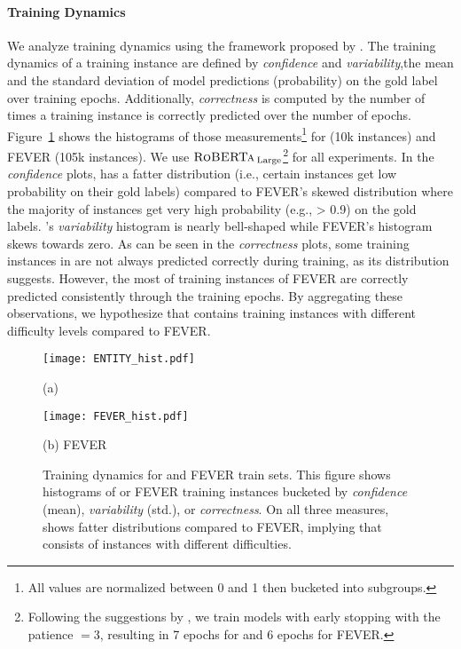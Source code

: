 \paragraph{Training Dynamics} We analyze training dynamics using the framework proposed by \citet{Swabha_Swayamdipta_2020}. The training dynamics of a training instance are defined by \emph{confidence} and \emph{variability},the mean and the standard deviation of model predictions (probability) on the gold label over training epochs. Additionally, \emph{correctness} is computed by the number of times a training instance is correctly predicted over the number of epochs. Figure~\ref{fig:trainin-dynamics} shows the histograms of those measurements\footnote{All values are normalized between 0 and 1 then bucketed into subgroups.} for \ours (10k instances) and FEVER (105k instances). We use $\textsc{RoBERTa}_{\:\text{Large}}$\footnote{Following the suggestions by \citet{Swabha_Swayamdipta_2020}, we train models with early stopping with the patience $= 3$, resulting in 7 epochs for \ours and  6 epochs for FEVER.} for all experiments. In the \emph{confidence} plots, \ours has a fatter distribution (i.e., certain instances get low probability on their gold labels) compared to FEVER's skewed distribution where the majority of instances get very high probability (e.g., > 0.9) on the gold labels. \oursno's \emph{variability} histogram is nearly bell-shaped while FEVER's histogram skews towards zero. As can be seen in the \emph{correctness} plots, some training instances in \ours are not always predicted correctly during training, as its distribution suggests. However, the most of training instances of FEVER are correctly predicted consistently through the training epochs. By aggregating these observations, we hypothesize that \ours contains training instances with different difficulty levels compared to FEVER. 

\begin{figure}
     \centering
     \begin{minipage}{0.48\textwidth}
         \centering
         \texttt{[image: ENTITY\_hist.pdf]}
         \caption*{(a) \ours}
         \label{fig1:dev}
     \end{minipage}
     \hspace{10pt}
     \begin{minipage}{0.48\textwidth}
         \centering
         \texttt{[image: FEVER\_hist.pdf]}
         \caption*{(b) FEVER}
         \label{fig:contrast}
     \end{minipage}
     \caption{Training dynamics for \ours and FEVER train sets. This figure shows histograms of \ours or FEVER  training instances bucketed by \textit{confidence} (mean), \textit{variability} (std.), or \textit{correctness}. On all three measures, \ours shows fatter distributions compared to FEVER, implying that \ours consists of instances with different difficulties.}
     \label{fig:trainin-dynamics}
\end{figure}

